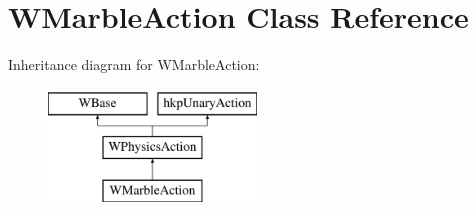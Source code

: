 \hypertarget{class_w_marble_action}{}\section{W\+Marble\+Action Class Reference}
\label{class_w_marble_action}
Inheritance diagram for W\+Marble\+Action\+:\begin{figure}[H]
\begin{center}
\leavevmode
\includegraphics[height=3.000000cm]{class_w_marble_action}
\end{center}
\end{figure}
